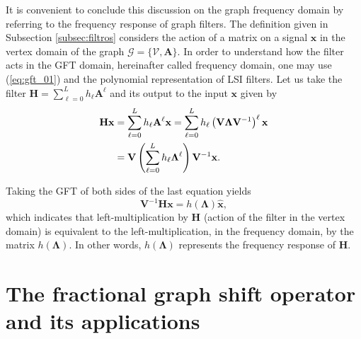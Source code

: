 
It is convenient to conclude this discussion on the graph frequency domain by referring to the frequency response of graph filters. The definition given in Subsection \ref{subsec:filtros} considers the action of a matrix on a signal $ \mathbf{x} $ in the vertex domain of the graph $ \mathcal{G} = \{\mathcal{V}, \mathbf{A}\} $. In order to understand how the filter acts in the GFT domain, hereinafter called frequency domain, one may use (\ref{eq:gft_01}) and the polynomial representation of LSI filters. Let us take the filter $ \mathbf{H} =\sum_{\ell=0}^{L} h_\ell \mathbf{A}^\ell $ and its output to the input $ \mathbf{x} $ given by
\begin{align}\label{eq:resposta_freq_01}
\mathbf{H} \mathbf{x} &= \sum_{\ell=0}^{L} h_\ell \mathbf{A}^\ell \mathbf{x} =
\sum_{\ell=0}^{L} h_\ell \left(\mathbf{V} \mathbf{\Lambda} \mathbf{V}^{-1}\right)^\ell \mathbf{x} \notag \\
&= \mathbf{V} \left(\sum_{\ell=0}^{L} h_\ell \mathbf{\Lambda}^\ell \right) \mathbf{V}^{-1} \mathbf{x}.
\end{align}

Taking the GFT of both sides of the last equation yields
\begin{equation}\label{eq:resposta_freq_02}
\mathbf{V}^{-1} \mathbf{H} \mathbf{x} =
h(\mathbf{\Lambda}) \widehat{\mathbf{x}},
\end{equation}
which indicates that left-multiplication by $ \mathbf{H} $ (action of the filter in the vertex domain) is equivalent to the left-multiplication, in the frequency domain, by the matrix $ h(\mathbf{\Lambda}) $. In other words, $ h(\mathbf{\Lambda}) $ represents the frequency response of $ \mathbf{H} $.


\chapter{The fractional graph shift operator and its applications}
\label{ch:FrGSO}

